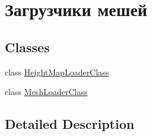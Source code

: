 \hypertarget{group___loaders}{}\section{Загрузчики мешей}
\label{group___loaders}
\subsection*{Classes}
\begin{DoxyCompactItemize}
\item 
class \hyperlink{class_height_map_loader_class}{Height\+Map\+Loader\+Class}
\item 
class \hyperlink{class_mesh_loader_class}{Mesh\+Loader\+Class}
\end{DoxyCompactItemize}


\subsection{Detailed Description}

